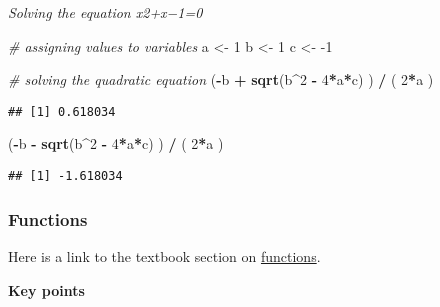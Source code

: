 \documentclass[
]{article}
\newenvironment{Shaded}{\begin{snugshade}}{\end{snugshade}}
\newcommand{\CommentTok}[1]{\textcolor[rgb]{0.56,0.35,0.01}{\textit{#1}}}
\newcommand{\DecValTok}[1]{\textcolor[rgb]{0.00,0.00,0.81}{#1}}
\newcommand{\KeywordTok}[1]{\textcolor[rgb]{0.13,0.29,0.53}{\textbf{#1}}}
\newcommand{\NormalTok}[1]{#1}
\newcommand{\OperatorTok}[1]{\textcolor[rgb]{0.81,0.36,0.00}{\textbf{#1}}}
\newcommand{\StringTok}[1]{\textcolor[rgb]{0.31,0.60,0.02}{#1}}
\begin{document}
\emph{Solving the equation x2+x−1=0}

\begin{Shaded}
\begin{Highlighting}[]
\CommentTok{# assigning values to variables}
\NormalTok{a <-}\StringTok{ }\DecValTok{1}
\NormalTok{b <-}\StringTok{ }\DecValTok{1}
\NormalTok{c <-}\StringTok{ }\DecValTok{-1}

\CommentTok{# solving the quadratic equation}
\NormalTok{(}\OperatorTok{-}\NormalTok{b }\OperatorTok{+}\StringTok{ }\KeywordTok{sqrt}\NormalTok{(b}\OperatorTok{^}\DecValTok{2} \OperatorTok{-}\StringTok{ }\DecValTok{4}\OperatorTok{*}\NormalTok{a}\OperatorTok{*}\NormalTok{c) ) }\OperatorTok{/}\StringTok{ }\NormalTok{( }\DecValTok{2}\OperatorTok{*}\NormalTok{a )}
\end{Highlighting}
\end{Shaded}

\begin{verbatim}
## [1] 0.618034
\end{verbatim}

\begin{Shaded}
\begin{Highlighting}[]
\NormalTok{(}\OperatorTok{-}\NormalTok{b }\OperatorTok{-}\StringTok{ }\KeywordTok{sqrt}\NormalTok{(b}\OperatorTok{^}\DecValTok{2} \OperatorTok{-}\StringTok{ }\DecValTok{4}\OperatorTok{*}\NormalTok{a}\OperatorTok{*}\NormalTok{c) ) }\OperatorTok{/}\StringTok{ }\NormalTok{( }\DecValTok{2}\OperatorTok{*}\NormalTok{a )}
\end{Highlighting}
\end{Shaded}

\begin{verbatim}
## [1] -1.618034
\end{verbatim}

\hypertarget{functions}{%
\subsubsection{Functions}\label{functions}}

Here is a link to the textbook section on
\href{https://rafalab.github.io/dsbook/r-basics.html\#functions}{functions}.

\textbf{Key points}
\end{document}
